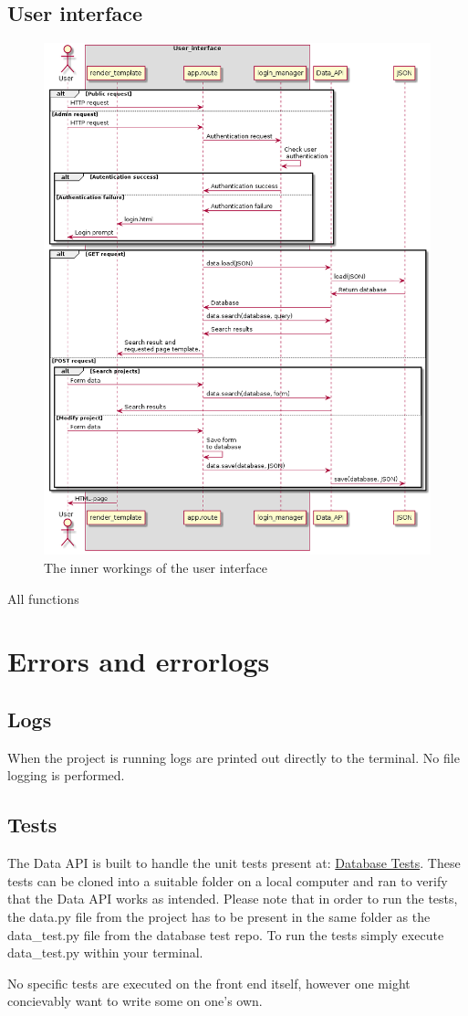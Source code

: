 \documentclass{TDP003mall}
\begin{document}
\subsection{User interface}
\begin{figure}[h!]
    \centering
    \includegraphics[width=\linewidth]{sekvensdiagram2-3.png}
    \caption{The inner workings of the user interface}
    \label{sekvensdiagram2}
\end{figure}
All functions
\section{Errors and errorlogs}
\subsection{Logs}
When the project is running logs are printed out directly to the terminal.
No file logging is performed.

\subsection{Tests}
The Data API is built to handle the unit tests present at: \href{https://gitlab.ida.liu.se/filst04/tdp003-2018-database-tests}{Database Tests}. These
tests can be cloned into a suitable folder on a local computer and ran to
verify that the Data API works as intended. Please note that in order to run
the tests, the data.py file from the project has to be present in the
same folder as the data\_test.py file from the database test repo.
To run the tests simply execute data\_test.py within your terminal.

No specific tests are executed on the front end itself, however one might
concievably want to write some on one's own.
\end{document}
